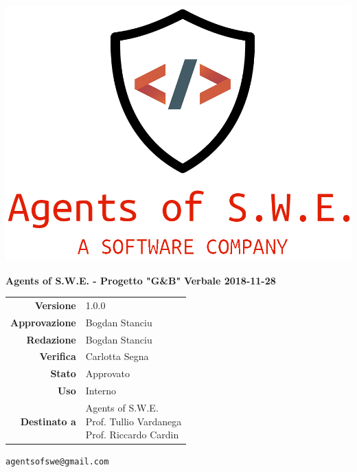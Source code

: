 


\begin{titlepage}
\thispagestyle{empty}

\begin{center}
\includegraphics[scale=0.3]{./images/logo.png} 


\large \textbf{Agents of S.W.E. - Progetto "G\&B"}
\vfill
\Huge \textbf{Verbale 2018-11-28}
\vfill

\large
\renewcommand{\arraystretch}{1.3}

\begin{tabular}{r|l}
\textbf{Versione} & 1.0.0\\
\textbf{Approvazione} & Bogdan Stanciu\\
\textbf{Redazione} & \parbox[t]{5cm}{Bogdan Stanciu}\\
\textbf{Verifica} & \parbox[t]{5cm}{Carlotta Segna}\\
\textbf{Stato} & Approvato\\
\textbf{Uso} & Interno\\
\textbf{Destinato a} & \parbox[t]{5cm}{Agents of S.W.E. \\Prof. Tullio Vardanega\\Prof. Riccardo Cardin}
\end{tabular}
\vfill
\small
\texttt{agentsofswe@gmail.com}
\end{center}
\end{titlepage}

\pagebreak



\pagebreak









